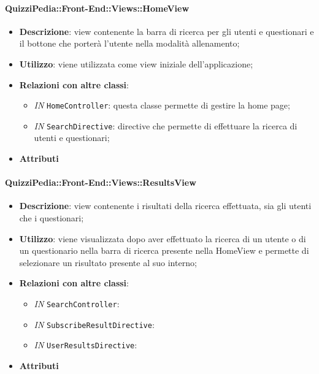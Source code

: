 \paragraph{QuizziPedia::Front-End::Views::HomeView}
\begin{itemize}
	\item \textbf{Descrizione}: view contenente la barra di ricerca per gli utenti e questionari e il bottone che porterà l'utente nella modalità allenamento;
	\item \textbf{Utilizzo}: viene utilizzata come view iniziale dell'applicazione;
	\item \textbf{Relazioni con altre classi}:
	\begin{itemize}
		\item \textit{IN} \texttt{HomeController}: questa classe permette di gestire la home page;
		\item \textit{IN} \texttt{SearchDirective}: directive che permette di effettuare la ricerca di utenti e questionari;
	\end{itemize}
	\item \textbf{Attributi}
\end{itemize}
	
\paragraph{QuizziPedia::Front-End::Views::ResultsView}
\begin{itemize}
	\item \textbf{Descrizione}: view contenente i risultati della ricerca effettuata, sia gli utenti che i questionari;
	\item \textbf{Utilizzo}: viene visualizzata dopo aver effettuato la ricerca di un utente o di un questionario nella barra di ricerca presente nella HomeView e permette di selezionare un risultato presente al suo interno; 
	\item \textbf{Relazioni con altre classi}:
	\begin{itemize}
		\item \textit{IN} \texttt{SearchController}:
		\item \textit{IN} \texttt{SubscribeResultDirective}: 
		\item \textit{IN} \texttt{UserResultsDirective}:
	\end{itemize}
	\item \textbf{Attributi}
\end{itemize}

